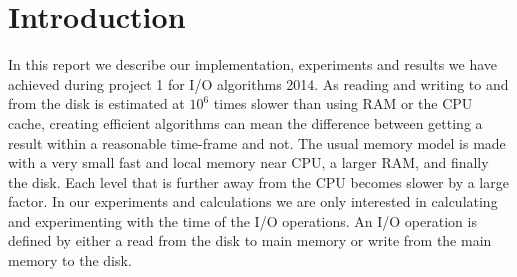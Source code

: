 \section{Introduction}

In this report we describe our implementation, experiments and results we have achieved during project 1 for I/O algorithms 2014.
As reading and writing to and from the disk is estimated at ${10^{6}}$ times slower than using RAM or the CPU cache, creating efficient algorithms can mean the difference between getting a result within a reasonable time-frame and not. 
The usual memory model is made with a very small fast and local memory near CPU, a larger RAM, and finally the disk. Each level that is further away from the CPU becomes slower by a large factor. In our experiments and calculations we are only interested in calculating and experimenting with the time of the I/O operations. An I/O operation is defined by either a read from the disk to main memory or write from the main memory to the disk.


